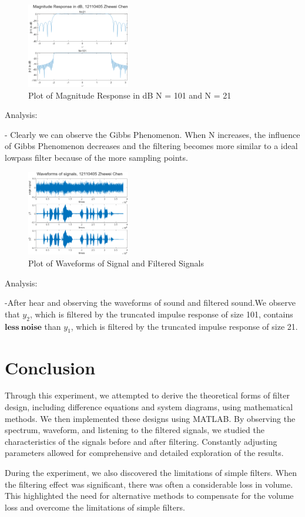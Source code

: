 \documentclass[journal]{IEEEtran}
\begin{document}
\begin{figure}[htbp]
   \centering
   \includegraphics[width=0.4\textwidth]{62.png}
\caption{Plot of Magnitude Response in dB N = 101 and N = 21}
   \end{figure}

\textcolor[rgb]{0,0.6,1}{Analysis:}

\textcolor[rgb]{0,0.6,1}{-}
Clearly we can observe the Gibbs Phenomenon.
When N increases, the influence of Gibbs Phenomenon decreases and the filtering becomes more similar to a ideal lowpass filter because of the more sampling points.

\begin{figure}[htbp]
   \centering
   \includegraphics[width=0.4\textwidth]{63.png}
\caption{Plot of Waveforms of Signal and Filtered Signals}
   \end{figure}      

\textcolor[rgb]{0,0.6,1}{Analysis:}

\textcolor[rgb]{0,0.6,1}{-}After hear and observing the waveforms of sound and filtered sound.We observe that \(y_2\), which is filtered by the truncated impulse response of size 101, contains \(\mathbf{less~noise}\)  than \(y_1\), which is filtered by the truncated impulse response of size 21.











\section{Conclusion}
Through this experiment, we attempted to derive the theoretical forms of filter design, including difference equations and system diagrams, using mathematical methods. We then implemented these designs using MATLAB. By observing the spectrum, waveform, and listening to the filtered signals, we studied the characteristics of the signals before and after filtering. Constantly adjusting parameters allowed for comprehensive and detailed exploration of the results.

During the experiment, we also discovered the limitations of simple filters. When the filtering effect was significant, there was often a considerable loss in volume. This highlighted the need for alternative methods to compensate for the volume loss and overcome the limitations of simple filters.
\end{document}
